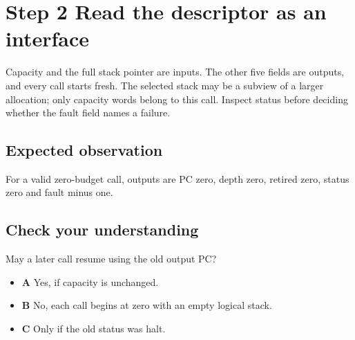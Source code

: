 \section{Step 2 Read the descriptor as an interface}\label{vm-s02}

Capacity and the full stack pointer are inputs. The other five fields are outputs, and every call starts fresh. The selected stack may be a subview of a larger allocation; only capacity words belong to this call. Inspect status before deciding whether the fault field names a failure.

\subsection{Expected observation}
For a valid zero-budget call, outputs are PC zero, depth zero, retired zero, status zero and fault minus one.

\subsection{Check your understanding}
May a later call resume using the old output PC?

\begin{itemize}
  \item \textbf{A} Yes, if capacity is unchanged.
  \item \textbf{B} No, each call begins at zero with an empty logical stack.
  \item \textbf{C} Only if the old status was halt.
\end{itemize}
